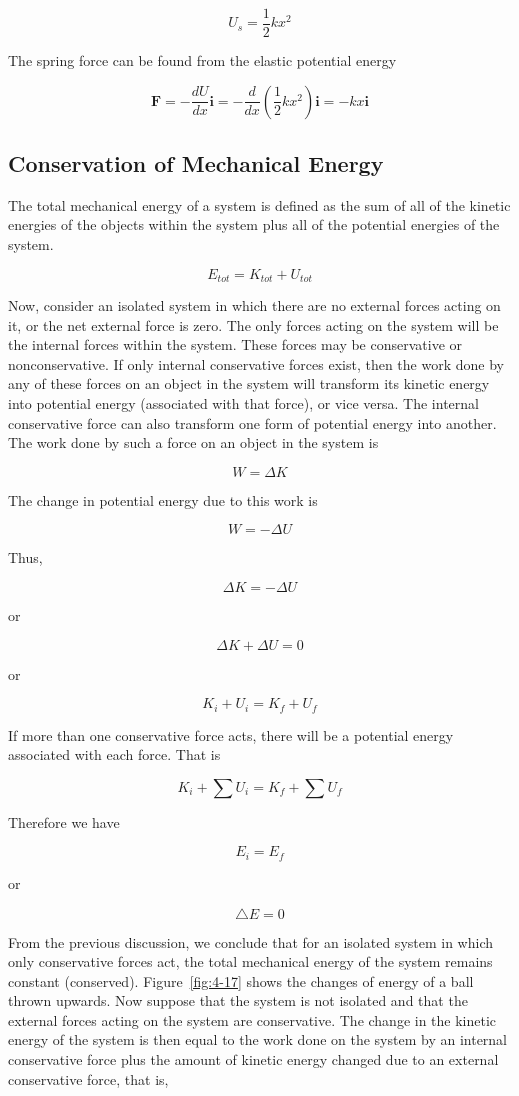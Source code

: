 \documentclass[10pt]{article}
\numberwithin{equation}{section}
\begin{document}
$$
U_{s}=\frac{1}{2} k x^{2}
$$

The spring force can be found from the elastic potential energy

$$
\mathbf{F}=-\frac{d U}{d x} \mathbf{i}=-\frac{d}{d x}\left(\frac{1}{2} k x^{2}\right) \mathbf{i}=-k x \mathbf{i}
$$

\subsection{Conservation of Mechanical Energy}\label{sec:4-5}
The total mechanical energy of a system is defined as the sum of all of the kinetic energies of the objects within the system plus all of the potential energies of the system.

$$
E_{t o t}=K_{t o t}+U_{t o t}
$$

Now, consider an isolated system in which there are no external forces acting on it, or the net external force is zero. The only forces acting on the system will be the internal forces within the system. These forces may be conservative or nonconservative. If only internal conservative forces exist, then the work done by any of these forces on an object in the system will transform its kinetic energy into potential energy (associated with that force), or vice versa. The internal conservative force can also transform one form of potential energy into another. The work done by such a force on an object in the system is

$$
W=\Delta K
$$

The change in potential energy due to this work is

$$
W=-\Delta U
$$

Thus,

$$
\Delta K=-\Delta U
$$

or

$$
\Delta K+\Delta U=0
$$

or

$$
K_{i}+U_{i}=K_{f}+U_{f}
$$

If more than one conservative force acts, there will be a potential energy associated with each force. That is

$$
K_{i}+\sum U_{i}=K_{f}+\sum U_{f}
$$

Therefore we have

$$
E_{i}=E_{f}
$$

or

$$
\triangle E=0
$$

From the previous discussion, we conclude that for an isolated system in which only conservative forces act, the total mechanical energy of the system remains constant (conserved). Figure~\ref{fig:4-17} shows the changes of energy of a ball thrown upwards. Now suppose that the system is not isolated and that the external forces acting on the system are conservative. The change in the kinetic energy of the system is then equal to the work done on the system by an internal conservative force plus the amount of kinetic energy changed due to an external conservative force, that is,
\end{document}
